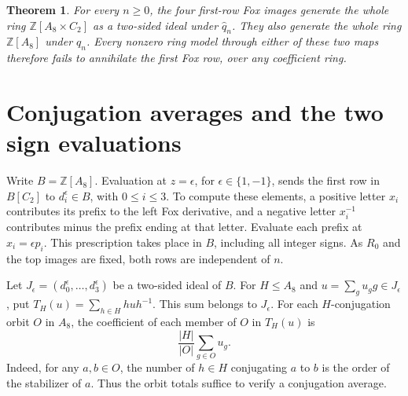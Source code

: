 \documentclass[11pt]{article}
\newtheorem{theorem}{Theorem}
\newcommand{\Z}{\mathbb Z}
\begin{document}
\begin{theorem}\label{thm:integral}
For every $n\ge0$, the four first-row Fox images generate the whole
ring $\Z[A_8\times C_2]$ as a two-sided ideal under $\widehat q_n$.
They also generate the whole ring $\Z[A_8]$ under $q_n$. Every
nonzero ring model through either of these two maps therefore fails
to annihilate the first Fox row, over any coefficient ring.
\end{theorem}

\section{Conjugation averages and the two sign evaluations}
Write $B=\Z[A_8]$. Evaluation at $z=\epsilon$, for
$\epsilon\in\{1,-1\}$, sends the first row in $B[C_2]$ to
$d_i^\epsilon\in B$, with $0\le i\le3$. To compute these elements,
a positive letter $x_i$ contributes its prefix to the left Fox
derivative, and a negative letter $x_i^{-1}$ contributes minus the
prefix ending at that letter. Evaluate each prefix at $x_i=\epsilon p_i$.
This prescription takes place in $B$, including all integer signs.
As $R_0$ and the top images are fixed, both rows are independent of $n$.

Let $J_\epsilon=(d_0^\epsilon,\dots,d_3^\epsilon)$ be a two-sided ideal
of $B$. For $H\le A_8$ and $u=\sum_g u_g g\in J_\epsilon$, put
$T_H(u)=\sum_{h\in H}huh^{-1}$. This sum belongs to $J_\epsilon$.
For each $H$-conjugation orbit $O$ in $A_8$, the coefficient of each
member of $O$ in $T_H(u)$ is
\begin{equation}\label{eq:average}
               \frac{|H|}{|O|}\sum_{g\in O}u_g .
\end{equation}
Indeed, for any $a,b\in O$, the number of $h\in H$ conjugating $a$
to $b$ is the order of the stabilizer of $a$.
Thus the orbit totals suffice to verify a conjugation average.
\end{document}
